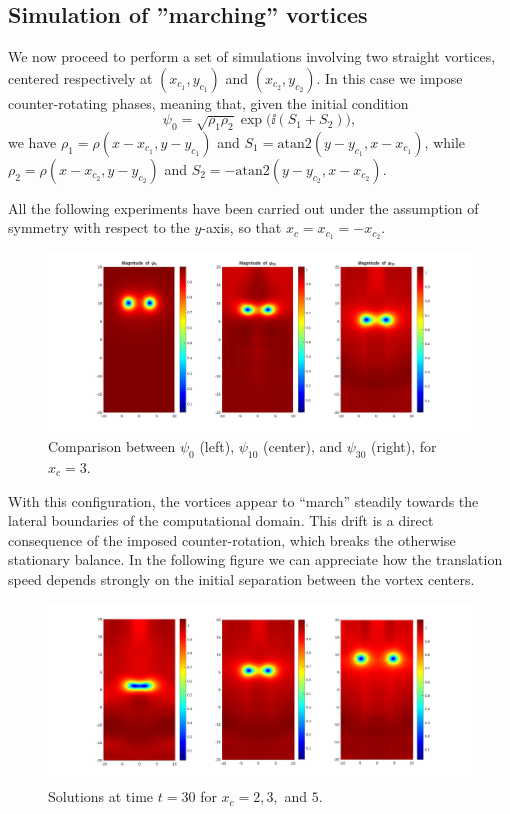 \subsection{Simulation of ''marching'' vortices}

We now proceed to perform a set of simulations involving two straight vortices, centered respectively at $(x_{c_1}, y_{c_1})$ and $(x_{c_2}, y_{c_2})$. In this case we impose counter-rotating phases, meaning that, given the initial condition 
\[
    \psi_0 = \sqrt{\rho_1 \rho_2}\exp\bigl(\ii (S_1 + S_2)\bigr),
\] 
we have $\rho_1 = \rho(x - x_{c_1}, y - y_{c_1})$ and $S_1 = \mathrm{atan2}(y - y_{c_1}, x - x_{c_1})$, while $\rho_2 = \rho(x - x_{c_2}, y - y_{c_2})$ and $S_2 = -\mathrm{atan2}(y - y_{c_2}, x - x_{c_2})$.

All the following experiments have been carried out under the assumption of symmetry with respect to the $y$-axis, so that $x_c = x_{c_1} = -x_{c_2}$.

\begin{figure}[H]
    \centering
    \includegraphics[width=\textwidth]{img/str_01030_3.pdf}
    \caption{Comparison between $\psi_0$ (left), $\psi_{10}$ (center), and $\psi_{30}$ (right), for $x_c = 3$.}
\end{figure}

With this configuration, the vortices appear to ``march'' steadily towards the lateral boundaries of the computational domain. This drift is a direct consequence of the imposed counter-rotation, which breaks the otherwise stationary balance. In the following figure we can appreciate how the translation speed depends strongly on the initial separation between the vortex centers.

\begin{figure}[H]
    \centering
    \includegraphics[width=\textwidth]{img/str_235_30t.pdf}
    \caption{Solutions at time $t = 30$ for $x_c = 2, 3,$ and $5$.}
\end{figure}

